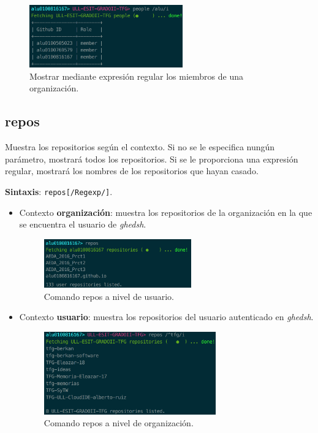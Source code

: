 \begin{figure}[H]
	\begin{center}
	\includegraphics[width=0.59\textwidth]{images/org-people-regexp.png}
	\caption{Mostrar mediante expresión regular los miembros de una organización.}
	\label{fig:org-people-regexp}
	\end{center}
\end{figure}

\subsection{repos}
\label{3.3.16}

Muestra los repositorios según el contexto. Si no se le especifica nungún parámetro, mostrará todos los repositorios. Si se le proporciona una expresión regular, mostrará los nombres de los repositorios que hayan casado.

\textbf{Sintaxis}: \verb|repos|\verb|[/Regexp/]|.
\begin{itemize}
	\item Contexto \textbf{organización}: muestra los repositorios de la organización en la que se encuentra el usuario de {\it ghedsh}.
	\begin{figure}[H]
		\begin{center}
		\includegraphics[width=0.60\textwidth]{images/user-repos.png}
		\caption{Comando repos a nivel de usuario.}
		\label{fig:user-repos}
		\end{center}
	\end{figure}
	\item Contexto \textbf{usuario}: muestra los repositorios del usuario autenticado en {\it ghedsh}.
	\begin{figure}[H]
		\begin{center}
		\includegraphics[width=0.70\textwidth]{images/org-repos.png}
		\caption{Comando repos a nivel de organización.}
		\label{fig:org-repos}
		\end{center}
	\end{figure}
\end{itemize}

